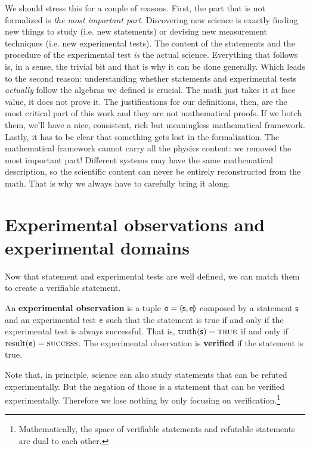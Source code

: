 \documentclass[11pt,letterpaper,fleqn]{memoir} %
\begin{document}
We should stress this for a couple of reasons. First, the part that is not formalized is \emph{the most important part}. Discovering new science is exactly finding new things to study (i.e. new statements) or devising new measurement techniques (i.e. new experimental tests). The content of the statements and the procedure of the experimental test \emph{is} the actual science. Everything that follows is, in a sense, the trivial bit and that is why it can be done generally. Which leads to the second reason: understanding whether statements and experimental tests \emph{actually} follow the algebras we defined is crucial. The math just takes it at face value, it does not prove it. The justifications for our definitions, then, are the most critical part of this work and they are not mathematical proofs. If we botch them, we'll have a nice, consistent, rich but meaningless mathematical framework. Lastly, it has to be clear that something gets lost in the formalization. The mathematical framework cannot carry all the physics content: we removed the most important part! Different systems may have the same mathematical description, so the scientific content can never be entirely reconstructed from the math. That is why we always have to carefully bring it along.

\section{Experimental observations and experimental domains}

Now that statement and experimental tests are well defined, we can match them to create a verifiable statement.

\begin{mathSection}
\begin{defn}
	An \textbf{experimental observation} is a tuple $\mathsf{o} = \llparenthesis \mathsf{s}, \mathsf{e} \rrparenthesis$ composed by a statement $\mathsf{s}$ and an experimental test $\mathsf{e}$ such that the statement is true if and only if the  experimental test is always successful. That is, $\operatorname{truth}(\mathsf{s})=\textsc{true}$ if and only if $\operatorname{result}(\mathsf{e})=\textsc{success}$. The experimental observation is \textbf{verified} if the statement is true.
\end{defn}
\end{mathSection}

Note that, in principle, science can also study statements that can be refuted experimentally. But the negation of those is a statement that can be verified experimentally. Therefore we lose nothing by only focusing on verification.\footnote{Mathematically, the space of verifiable statements and refutable statements are dual to each other.}
\end{document}
